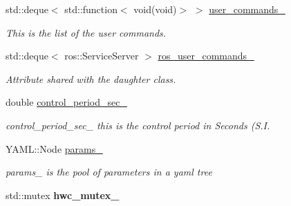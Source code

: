 \begin{DoxyCompactItemize}
\mbox{\label{classdynamic__graph_1_1DynamicGraphManager_a1a07b4003cc1a0021e675847cc57ef5c}} 
std\+::deque$<$ std\+::function$<$ void(void)$>$ $>$ \hyperlink{classdynamic__graph_1_1DynamicGraphManager_a1a07b4003cc1a0021e675847cc57ef5c}{user\+\_\+commands\+\_\+}
\begin{DoxyCompactList}\small\item\em This is the list of the user commands. \end{DoxyCompactList}\item 
std\+::deque$<$ ros\+::\+Service\+Server $>$ \hyperlink{classdynamic__graph_1_1DynamicGraphManager_a0fb35bc44f331db3570c09b75b49cd15}{ros\+\_\+user\+\_\+commands\+\_\+}
\begin{DoxyCompactList}\small\item\em Attribute shared with the daughter class. \end{DoxyCompactList}\item 
double \hyperlink{classdynamic__graph_1_1DynamicGraphManager_a2c0f1323534e9e1b17f3b1cc23f0c7f1}{control\+\_\+period\+\_\+sec\+\_\+}
\begin{DoxyCompactList}\small\item\em control\+\_\+period\+\_\+sec\+\_\+ this is the control period in Seconds (S.\+I. \end{DoxyCompactList}\item 
\mbox{\label{classdynamic__graph_1_1DynamicGraphManager_ad3773835c294117a500af96d272921ea}} 
Y\+A\+M\+L\+::\+Node \hyperlink{classdynamic__graph_1_1DynamicGraphManager_ad3773835c294117a500af96d272921ea}{params\+\_\+}
\begin{DoxyCompactList}\small\item\em params\+\_\+ is the pool of parameters in a yaml tree \end{DoxyCompactList}\item 
\mbox{\label{classdynamic__graph_1_1DynamicGraphManager_a1b7d9df75790d22b3258e1bd42fd537d}} 
std\+::mutex {\bfseries hwc\+\_\+mutex\+\_\+}
\end{DoxyCompactItemize}
